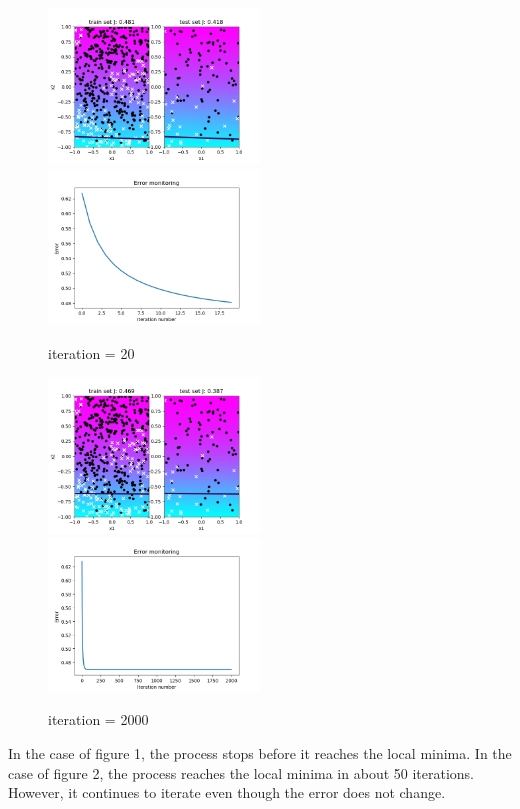\documentclass[a4paper]{article}
\begin{document}
\begin{figure}[h]
	\includegraphics[width=0.5\textwidth]{logreg_deg1_iter20.png}
	\includegraphics[width=0.5\textwidth]{logreg_deg1_iter20_error.png}
	\caption{iteration = 20}
\end{figure}
\clearpage
\begin{figure}[h]
	\includegraphics[width=0.5\textwidth]{logreg_deg1_iter2000.png}
	\includegraphics[width=0.5\textwidth]{logreg_deg1_iter2000_error.png}
	\caption{iteration = 2000}
\end{figure}

In the case of figure 1, the process stops before it reaches the local minima. In the case of figure 2, the process reaches the local minima in about 50 iterations. However, it continues to iterate even though the error does not change.
\end{document}
